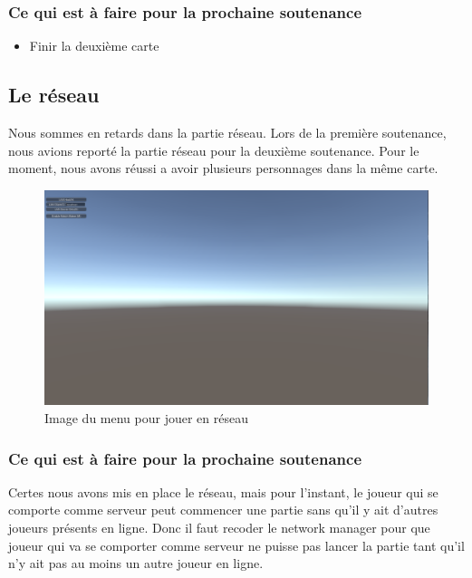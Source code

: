 \documentclass[a4paper, 12pt]{article}
\begin{document}
\subsubsection*{Ce qui est à faire pour la prochaine soutenance}
\begin{itemize}
\item Finir la deuxième carte

\end{itemize}

\newpage

	\subsection{Le réseau}
Nous sommes en retards dans la partie réseau. Lors de la première soutenance, nous avions reporté la partie réseau pour la deuxième soutenance. Pour le moment, nous avons réussi a avoir plusieurs personnages dans la même carte. 



\begin{figure}[!ht]
	\centerline{\includegraphics[scale=0.3]{Menureseauprojet.png}}
	\caption*{Image du menu pour jouer en réseau}
\end{figure}


\subsubsection*{Ce qui est à faire pour la prochaine soutenance}

\par Certes nous avons mis en place le réseau, mais pour l’instant, le joueur qui se comporte comme serveur peut commencer une partie sans qu’il y ait d’autres joueurs présents en ligne. Donc il faut recoder le network manager  pour que joueur qui va se comporter comme serveur ne puisse pas lancer la partie tant qu’il n'y ait pas au moins un autre joueur en ligne.
\end{document}
